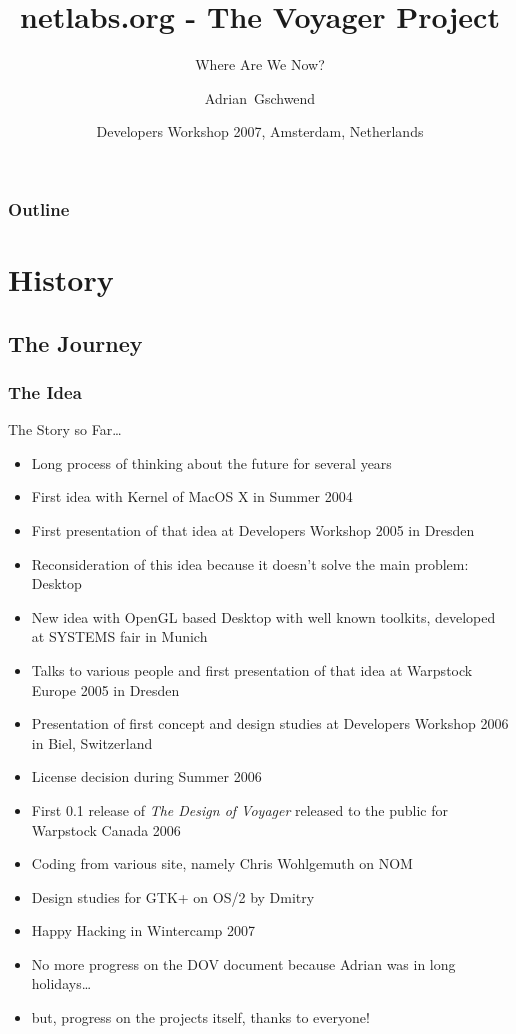\documentclass{beamer}
\title[netlabs.org - The Voyager Project]
{netlabs.org - The Voyager Project}
\subtitle
{Where Are We Now?}
\author[Adrian Gschwend]
{Adrian~Gschwend}
\institute[netlabs.org]
{
netlabs.org - Open Source Software
}
\date[07.07.2007]
{Developers Workshop 2007, Amsterdam, Netherlands}
\begin{document}
\begin{frame}
\titlepage
\end{frame}

\begin{frame}
\frametitle{Outline}
\tableofcontents[hideallsubsections]
\end{frame}

\section{History}

\subsection{The Journey}
\begin{frame}[allowframebreaks=0.6]
\frametitle{The Idea}
The Story so Far\ldots
\begin{itemize}
  \item Long process of thinking about the future for several years
  \item First idea with Kernel of MacOS X in Summer 2004
  \item First presentation of that idea at Developers Workshop 2005 in Dresden
  \item Reconsideration of this idea because it doesn't solve the main problem: Desktop
  \item New idea with OpenGL based Desktop with well known toolkits, developed at SYSTEMS fair in Munich
  \item Talks to various people and first presentation of that idea at
  Warpstock Europe 2005 in Dresden
  \item Presentation of first concept and design studies at Developers
  Workshop 2006 in Biel, Switzerland
  \item License decision during Summer 2006
  \item First 0.1 release of \textit{The Design of Voyager} released to the
  public for Warpstock Canada 2006
  \item Coding from various site, namely Chris Wohlgemuth on NOM
  \item Design studies for GTK+ on OS/2 by Dmitry
  \item Happy Hacking in Wintercamp 2007
  \item No more progress on the DOV document because Adrian was in long holidays\ldots
  \item but, progress on the projects itself, thanks to everyone!
\end{itemize}
\end{frame}
\end{document}
